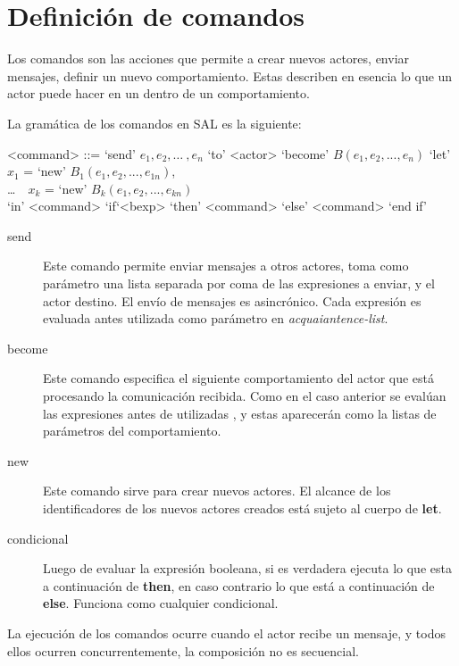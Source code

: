 \section{Definición de comandos}

Los comandos son las acciones que permite a \SAL crear nuevos actores, enviar mensajes, definir un nuevo comportamiento. Estas describen en esencia lo que un actor puede hacer en un dentro de un comportamiento.

La gramática de los comandos en SAL es la siguiente:

\begin{grammar}
  <command> ::= `send' $e_1, e_2, \ldots\ , e_n$ `to' <actor>  
  \alt `become' $B(e_1, e_2, ..., e_n)$
  \alt `let' $x_1$ = `new' $B_1(e_1, e_2, ..., e_{1n})$, \\
   \ldots\ \ $x_k$ = `new' $B_k(e_1, e_2, ..., e_{kn})$   \\
  `in' <command> 
  \alt `if`<bexp> `then' <command> `else' <command> `end if'
\end{grammar}

\begin{description}
\item [send] Este comando permite enviar mensajes a otros actores, toma como parámetro una lista separada por coma de las expresiones a enviar, y el actor destino. El envío de mensajes es asincrónico. Cada expresión es evaluada antes utilizada como parámetro en \textit{acquaiantence-list}.
\item [become] Este comando especifica el siguiente comportamiento del actor que está procesando la comunicación recibida. Como en el caso anterior se evalúan las expresiones antes de utilizadas , y estas aparecerán como la listas de parámetros del comportamiento. 
\item[new] Este comando sirve para crear nuevos actores. El alcance de los
  identificadores de los nuevos actores creados está sujeto al cuerpo de \textbf{let}.
\item[condicional] Luego de evaluar la expresión booleana, si es verdadera
  ejecuta lo que esta a continuación de \textbf{then}, en caso contrario lo que está a
  continuación de \textbf{else}. Funciona como cualquier condicional.
 
\end{description}

La ejecución de los comandos ocurre cuando el actor recibe un mensaje, y todos
ellos ocurren concurrentemente, la composición no es secuencial.

